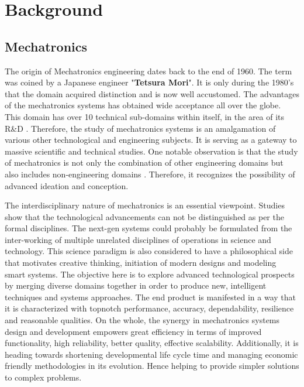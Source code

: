 \chapter{Background}
\label{chap: bg}

\section{Mechatronics}
The origin of Mechatronics engineering dates back to the end of 1960. The term was coined by a Japanese engineer "\textbf{Tetsura Mori}"\cite{dixit2017history}. It is only during the 1980's that the domain acquired distinction and is now well accustomed. The advantages of the mechatronics systems has obtained wide acceptance all over the globe. This domain has over 10 technical sub-domains within itself, in the area of its R\&D \cite{brighthubengineering_2010}. Therefore, the study of mechatronics systems is an amalgamation of various other technological and engineering subjects. It is serving as a gateway to massive scientific and technical studies. One notable observation is that the study of mechatronics is not only the combination of other engineering domains but also includes non-engineering domains \cite{bradley_2004}\cite{habib_mechatronics_2006}. Therefore, it recognizes the possibility of advanced ideation and conception.

The interdisciplinary nature of mechatronics is an essential viewpoint. Studies show that the technological advancements can not be distinguished as per the formal disciplines. The next-gen systems could probably be formulated  from the inter-working of multiple unrelated disciplines of operations in science and technology\cite{wikander_science_2001}. This science paradigm is also considered to have a philosophical side that motivates creative thinking, initiation of modern designs and modeling smart systems. The objective here is to explore advanced technological prospects by merging diverse domains together in order to produce new, intelligent techniques and systems approaches. The end product is manifested in a way that it is characterized with topnotch performance, accuracy, dependability, resilience and reasonable qualities. On the whole, the synergy in mechatronics systems design and development empowers great efficiency in terms of improved functionality, high reliability, better quality, effective scalability. Additionally, it is heading towards shortening developmental life cycle time and managing economic friendly methodologies in its evolution. Hence helping to provide simpler solutions to complex problems\cite{habib_mechatronics_2007}.

